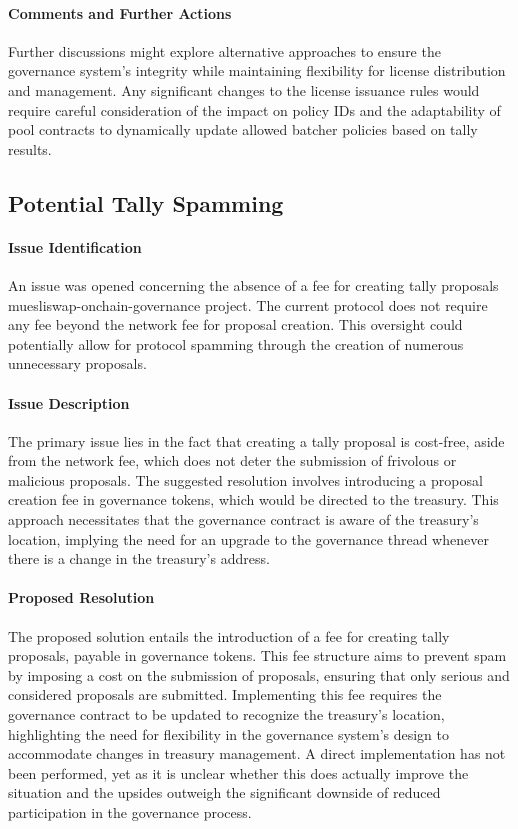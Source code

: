 \documentclass[11pt]{article}
\begin{document}
\paragraph{Comments and Further Actions}
Further discussions might explore alternative approaches to ensure the governance system's integrity while maintaining flexibility for license distribution and management. Any significant changes to the license issuance rules would require careful consideration of the impact on policy IDs and the adaptability of pool contracts to dynamically update allowed batcher policies based on tally results.


\subsection{Potential Tally Spamming}

\paragraph{Issue Identification}
An issue was opened concerning the absence of a fee for creating tally proposals muesliswap-onchain-governance project.
The current protocol does not require any fee beyond the network fee for proposal creation.
This oversight could potentially allow for protocol spamming through the creation of numerous unnecessary proposals.

\paragraph{Issue Description}
The primary issue lies in the fact that creating a tally proposal is cost-free, aside from the network fee, which does not deter the submission of frivolous or malicious proposals.
The suggested resolution involves introducing a proposal creation fee in governance tokens, which would be directed to the treasury.
This approach necessitates that the governance contract is aware of the treasury's location, implying the need for an upgrade to the governance thread whenever there is a change in the treasury's address.

\paragraph{Proposed Resolution}
The proposed solution entails the introduction of a fee for creating tally proposals, payable in governance tokens.
This fee structure aims to prevent spam by imposing a cost on the submission of proposals, ensuring that only serious and considered proposals are submitted.
Implementing this fee requires the governance contract to be updated to recognize the treasury's location, highlighting the need for flexibility in the governance system's design to accommodate changes in treasury management.
A direct implementation has not been performed, yet as it is unclear whether this does actually improve the situation
and the upsides outweigh the significant downside of reduced participation in the governance process.
\end{document}
